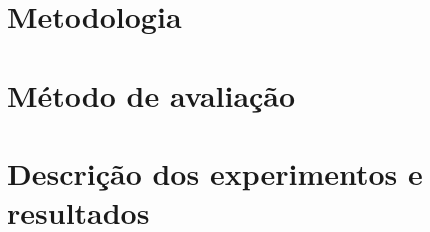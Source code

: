 \section{Metodologia}
\label{cha:metodologia}
	

\newpage

\section{Método de avaliação}
\label{cha:avaliacao_parceval}
	

\newpage

\section{Descrição dos experimentos e resultados}
\label{cha:experimentos}
	

\newpage

%	

